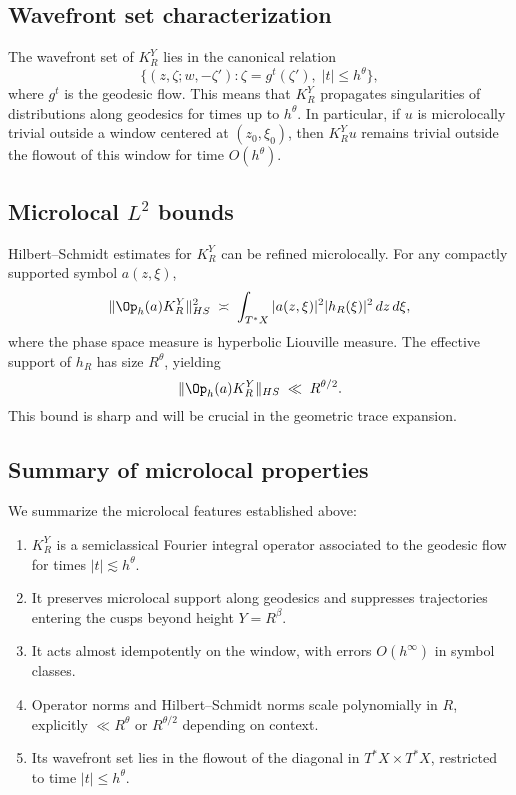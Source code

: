 \subsection{Wavefront set characterization}\label{subsec:micro-wavefront}

The wavefront set of $K_R^Y$ lies in the canonical relation
\[
\{(z,\zeta;w,-\zeta') : \zeta = g^t(\zeta'), \; |t|\le h^\theta\},
\]
where $g^t$ is the geodesic flow. This means that $K_R^Y$ propagates singularities of distributions along geodesics for times up to $h^\theta$. In particular, if $u$ is microlocally trivial outside a window centered at $(z_0,\xi_0)$, then $K_R^Y u$ remains trivial outside the flowout of this window for time $O(h^\theta)$.

\subsection{Microlocal $L^2$ bounds}\label{subsec:micro-L2}

Hilbert--Schmidt estimates for $K_R^Y$ can be refined microlocally. For any compactly supported symbol $a(z,\xi)$,
\[
\|\Op_h(a)K_R^Y\|_{HS}^2 \;\asymp\; \int_{T^*X} |a(z,\xi)|^2 |h_R(\xi)|^2\, dz\,d\xi,
\]
where the phase space measure is hyperbolic Liouville measure. The effective support of $h_R$ has size $R^\theta$, yielding
\[
\|\Op_h(a)K_R^Y\|_{HS} \;\ll\; R^{\theta/2}.
\]
This bound is sharp and will be crucial in the geometric trace expansion.

\subsection{Summary of microlocal properties}\label{subsec:micro-summary}

We summarize the microlocal features established above:
\begin{enumerate}
\item $K_R^Y$ is a semiclassical Fourier integral operator associated to the geodesic flow for times $|t|\lesssim h^\theta$.
\item It preserves microlocal support along geodesics and suppresses trajectories entering the cusps beyond height $Y=R^\beta$.
\item It acts almost idempotently on the window, with errors $O(h^\infty)$ in symbol classes.
\item Operator norms and Hilbert--Schmidt norms scale polynomially in $R$, explicitly $\ll R^\theta$ or $R^{\theta/2}$ depending on context.
\item Its wavefront set lies in the flowout of the diagonal in $T^*X\times T^*X$, restricted to time $|t|\le h^\theta$.
\end{enumerate}

